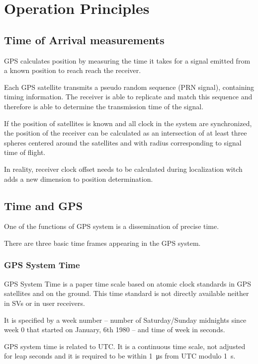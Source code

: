 \section{Operation Principles}

\subsection{Time of Arrival measurements}

GPS calculates position by measuring the time it takes for a signal
emitted from a known position to reach reach the receiver.

Each GPS satellite transmits a pseudo random sequence (PRN signal),
containing timing information.
The receiver is able to replicate and match this sequence and therefore
is able to determine the transmission time of the signal.

If the position of satellites is known and all clock in the system are
synchronized, the position of the receiver
can be calculated as an intersection of at least three spheres centered around the satellites
and with radius corresponding to signal time of flight.

In reality, receiver clock offset needs to be calculated
during localization witch adds a new dimension to position determination.

\subsection{Time and GPS}

One of the functions of GPS system is a dissemination of precise time.

There are three basic time frames appearing in the GPS system.

\subsubsection{GPS System Time}

GPS System Time is a paper time scale based on atomic clock standards in GPS
satellites and on the ground.
This time standard is not directly available neither in SVs or in user receivers.

It is specified by a week number -- number of Saturday/Sunday midnights since week 0
that started on January, 6th 1980 -- and time of week in seconds.

GPS system time is related to UTC.
It is a continuous time scale, not adjusted for leap seconds
and it is required to be within \SI{1}{\micro\second} from UTC modulo \SI{1}{\second}.

